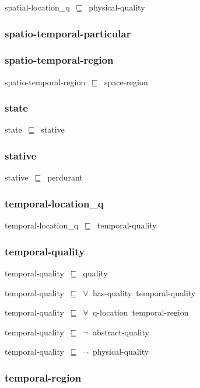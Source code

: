 \documentclass{article}
\begin{document}
spatial-location\_q~\ensuremath{\sqsubseteq}~physical-quality~

\subsubsection*{spatio-temporal-particular}

\subsubsection*{spatio-temporal-region}

spatio-temporal-region~\ensuremath{\sqsubseteq}~space-region~

\subsubsection*{state}

state~\ensuremath{\sqsubseteq}~stative~

\subsubsection*{stative}

stative~\ensuremath{\sqsubseteq}~perdurant~

\subsubsection*{temporal-location_q}

temporal-location\_q~\ensuremath{\sqsubseteq}~temporal-quality~

\subsubsection*{temporal-quality}

temporal-quality~\ensuremath{\sqsubseteq}~quality~

temporal-quality~\ensuremath{\sqsubseteq}~\ensuremath{\forall}~has-quality~temporal-quality~

temporal-quality~\ensuremath{\sqsubseteq}~\ensuremath{\forall}~q-location~temporal-region~

temporal-quality~\ensuremath{\sqsubseteq}~\ensuremath{\lnot}~abstract-quality

temporal-quality~\ensuremath{\sqsubseteq}~\ensuremath{\lnot}~physical-quality

\subsubsection*{temporal-region}
\end{document}
